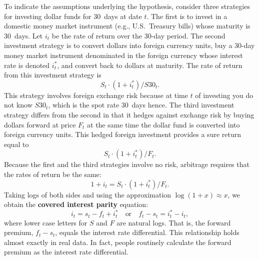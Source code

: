 To indicate the assumptions underlying the hypothesis, consider three strategies
for investing dollar funds for 30~days at date $t$. The first is to invest in a domestic
money market instrument (e.g., U.S.\ Treasury bills) whose maturity is 30~days. Let
$i_t$ be the rate of return over the 30-day period. The second investment strategy is to
convert dollars into foreign currency units, buy a 30-day money market instrument
denominated in the foreign currency whose interest rate is denoted $i_t^*$, and convert
back to dollars at maturity. The rate of return from this investment strategy is
\[
  S_t \cdot (1 + i_t^*) / S30_t.
\]
This strategy involves foreign exchange risk because at time $t$ of investing you
do not know $S30_t$, which is the spot rate 30~days hence. The third investment
strategy differs from the second in that it hedges against exchange risk by buying
dollars forward at price $F_t$ at the same time the dollar fund is converted into foreign
currency units. This hedged foreign investment provides a sure return equal to
\[
  S_t \cdot (1 + i_t^*) / F_t.
\]
Because the first and the third strategies involve no risk, arbitrage requires that the
rates of return be the same:
\[
  1 + i_t = S_t \cdot (1 + i_t^*) / F_t.
\]
Taking logs of both sides and using the approximation $\log(1 + x) \approx x$, we obtain
the \textbf{covered interest parity} equation:
\begin{equation}
  i_t = s_t - f_t + i_t^* \quad \text{or} \quad
  f_t - s_t = i_t^* - i_t,
  \label{eq:6.8.1}
\end{equation}
where lower case letters for $S$ and $F$ are natural logs. That is, the forward premium,
$f_t - s_t$, equals the interest rate differential. This relationship holds almost exactly
in real data. In fact, people routinely calculate the forward premium as the interest
rate differential.

